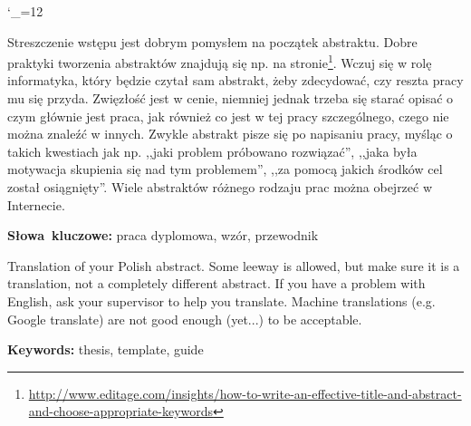 \documentclass[12pt,a4paper,leqno,oneside,titlepage]{book}
\newenvironment{abstractpage}
  {\cleardoublepage\vspace*{\fill}\thispagestyle{empty}}
  {\vfill\cleardoublepage}
\newenvironment{abstract}[1]
  {\bigskip\selectlanguage{#1}%
   \begin{center}\bfseries\abstractname\end{center}}
  {\par\bigskip}
\begin{document}
\vspace{12cm} \hspace{1cm}\phantom{.}\\
\phantom{.}\hspace{5cm}{Tutaj będą podziękowania dla sąsiadów}\\
\phantom{.}\hspace{5cm}{za siedzenie cicho.}\\
\phantom{.}\hspace{5cm}{}\\
\phantom{.}\hspace{5cm}{I coś dla promotora.}\\

\newpage
\frontmatter
\pagestyle{plain}
{
    \catcode`\_=12
    \tableofcontents
} 
\listoffigures
\listoftables
\begingroup
\let\clearpage\relax
\lstlistoflistings
\endgroup

\begin{abstractpage}
\begin{abstract}{polish}
Streszczenie wstępu jest dobrym pomysłem na początek abstraktu. Dobre praktyki tworzenia abstraktów znajdują się np. na stronie\footnote{
\url{http://www.editage.com/insights/how-to-write-an-effective-title-and-abstract-and-choose-appropriate-keywords}}.
Wczuj się w rolę informatyka, który będzie czytał sam abstrakt, żeby zdecydować, czy reszta pracy mu się przyda. Zwięzłość jest w cenie, niemniej jednak trzeba się starać opisać o czym głównie jest praca, jak również co jest w tej pracy szczególnego, czego nie można znaleźć w innych. Zwykle abstrakt pisze się po napisaniu pracy, myśląc o takich kwestiach jak np. ,,jaki problem próbowano rozwiązać'', ,,jaka była motywacja skupienia się nad tym problemem'', ,,za pomocą jakich środków cel został osiągnięty''. Wiele abstraktów różnego rodzaju prac można obejrzeć w Internecie.
\end{abstract}
\smallskip
\noindent \textbf{Słowa~kluczowe:} praca dyplomowa, wzór, przewodnik

\begin{abstract}{english}
Translation of your Polish abstract. Some leeway is allowed, but make sure it is a translation, not a completely different abstract. If you have a problem with English, ask your supervisor to help you translate. Machine translations (e.g. Google translate) are not good enough (yet...) to be acceptable.
\end{abstract}
\smallskip
\noindent \textbf{Keywords:} thesis, template, guide
\end{abstractpage}
\end{document}
